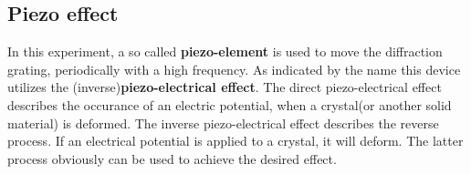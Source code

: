 \subsection{Piezo effect}
\label{subsec:}
In this experiment, a so called \textbf{piezo-element} is used to move the
diffraction grating, periodically with a high frequency.
As indicated by the name this device utilizes the (inverse)\textbf{piezo-electrical effect}.
The direct piezo-electrical effect describes the occurance of an electric potential,
when a crystal(or another solid material) is deformed. The inverse piezo-electrical effect describes
the reverse process. If an electrical potential is applied to a crystal, it will deform.
The latter process obviously can be used to achieve the desired effect.
